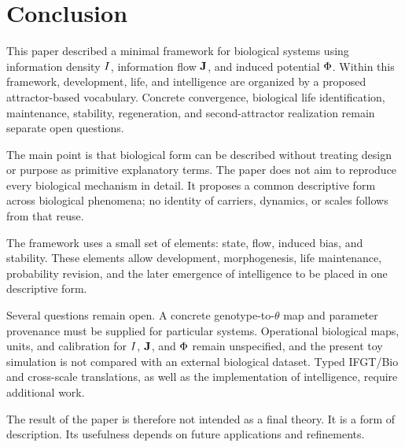 \section{Conclusion}

This paper described a minimal framework for biological systems using information density \(I\), information flow \(\mathbf{J}\), and induced potential \(\Phi\). Within this framework, development, life, and intelligence are organized by a proposed attractor-based vocabulary. Concrete convergence, biological life identification, maintenance, stability, regeneration, and second-attractor realization remain separate open questions.

The main point is that biological form can be described without treating design or purpose as primitive explanatory terms. The paper does not aim to reproduce every biological mechanism in detail. It proposes a common descriptive form across biological phenomena; no identity of carriers, dynamics, or scales follows from that reuse.

The framework uses a small set of elements: state, flow, induced bias, and stability. These elements allow development, morphogenesis, life maintenance, probability revision, and the later emergence of intelligence to be placed in one descriptive form.

Several questions remain open. A concrete genotype-to-\(\theta\) map and parameter provenance must be supplied for particular systems. Operational biological maps, units, and calibration for \(I\), \(\mathbf{J}\), and \(\Phi\) remain unspecified, and the present toy simulation is not compared with an external biological dataset. Typed IFGT/Bio and cross-scale translations, as well as the implementation of intelligence, require additional work.

The result of the paper is therefore not intended as a final theory. It is a form of description. Its usefulness depends on future applications and refinements.
